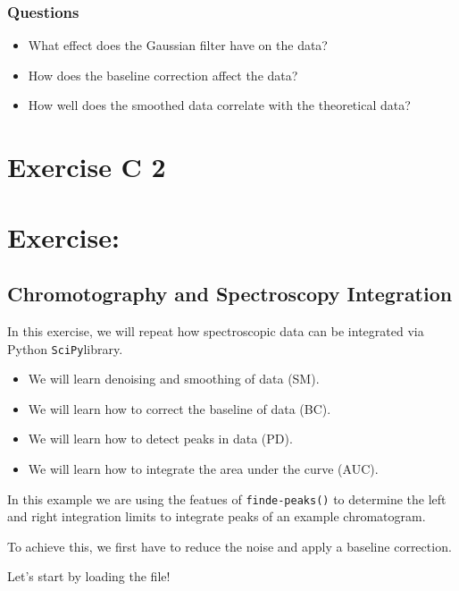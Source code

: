 \documentclass[
  letterpaper,
  DIV=11,
  numbers=noendperiod]{scrreprt}
\providecommand{\tightlist}{%
  \setlength{\itemsep}{0pt}\setlength{\parskip}{0pt}}\usepackage{longtable,booktabs,array}
\begin{document}
\subsection{Questions}\label{questions-6}

\begin{itemize}
\tightlist
\item
  What effect does the Gaussian filter have on the data?
\item
  How does the baseline correction affect the data?
\item
  How well does the smoothed data correlate with the theoretical data?
\end{itemize}

\chapter{Exercise C 2}\label{exercise-c-2}

\chapter{Exercise:}\label{exercise-7}

\section{Chromotography and Spectroscopy
Integration}\label{chromotography-and-spectroscopy-integration}

In this exercise, we will repeat how spectroscopic data can be
integrated via Python \texttt{SciPy}library.

\begin{itemize}
\tightlist
\item
  We will learn denoising and smoothing of data (SM).
\item
  We will learn how to correct the baseline of data (BC).
\item
  We will learn how to detect peaks in data (PD).
\item
  We will learn how to integrate the area under the curve (AUC).
\end{itemize}

In this example we are using the featues of \texttt{finde-peaks()} to
determine the left and right integration limits to integrate peaks of an
example chromatogram.

To achieve this, we first have to reduce the noise and apply a baseline
correction.

Let's start by loading the file!
\end{document}

